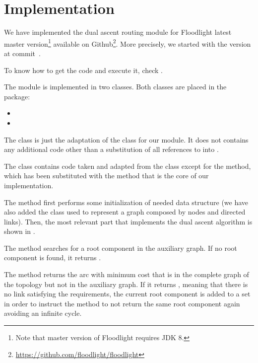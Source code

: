 \chapter{Implementation}\label{ch:implementation}

We have implemented the dual ascent routing module for Floodlight latest master
version\footnote{Note that master version of Floodlight requires JDK 8.}
available on Github\footnote{\url{https://github.com/floodlight/floodlight}}.
More precisely, we started with the version at
commit~\href{https://github.com/floodlight/floodlight/tree/d737cb05656a6038f4e2277ffb4503d45b7b29cb}{}.

To know how to get the code and execute it, check
.

The module is implemented in two classes. Both classes are placed in the
 package:
\begin{itemize}
	\item {}
	\item {}
\end{itemize}

The  class is just the adaptation of the
 class for our module. It does not contains any additional
code other than a substitution of all references to  into
.

The  class contains code taken and adapted from
the  class except for the  method, which
has been substituted with the  method that is the core of our
implementation.

The  method first performs some initialization of needed data
structure (we have also added the  class used to represent a graph
composed by nodes and directed links). Then, the most relevant part that
implements the dual ascent algorithm is shown in .



The  method searches for a root component in the auxiliary
graph. If no root component is found, it returns .

The  method returns the arc with minimum cost that is in the
complete graph of the topology but not in the auxiliary graph. If it returns
, meaning that there is no link satisfying the requirements, the
current root component is added to a set in order to instruct the
 method to not return the same root component again avoiding
an infinite cycle.


